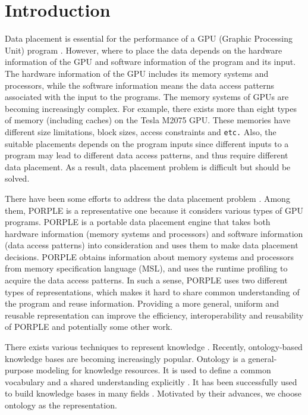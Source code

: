 \documentclass{sig-alternate}
\begin{document}
\section{Introduction}
Data placement is essential for the performance of a GPU (Graphic Processing Unit) program \cite{related1}. However, where to place the data depends on the hardware information of the GPU and software information of the program and its input. The hardware information of the GPU includes its memory systems and processors, while the software information means the data access patterns associated with the input to the programs. The memory systems of GPUs are becoming increasingly complex. For example, there exists more than eight types of memory (including caches) on the Tesla M2075 GPU. These memories have different size limitations, block sizes, access constraints and \texttt{etc.} Also, the suitable placements depends on the program inputs since different inputs to a program may lead to different data access patterns, and thus require different data placement. As a result, data placement problem is difficult but should be solved.

There have been some efforts to address the data placement problem \cite{related1, related2, related3, porple}. Among them, PORPLE \cite{porple} is a representative one because it considers various types of GPU programs. PORPLE is a portable data placement engine that takes both hardware information (memory systems and processors) and software information (data access patterns) into consideration and uses them to make data placement decisions. PORPLE obtains information about memory systems and processors from memory specification language (MSL), and uses the runtime profiling to acquire the data access patterns. In such a sense, PORPLE uses two different types of representations, which makes it hard to share common understanding of the program and reuse information. Providing a more general, uniform and reusable representation can improve the efficiency, interoperability and reusability of PORPLE and potentially some other work.

There exists various techniques to represent knowledge \cite{intro2}. Recently, ontology-based knowledge bases are becoming increasingly popular. Ontology is a general-purpose modeling for knowledge resources. It is used to define a common vocabulary and a shared understanding explicitly \cite{ontology1, ontology2}. It has been successfully used to build knowledge bases in many fields \cite{ontology3, ontology4, ontology5, ontology6, work1, work2}. Motivated by their advances, we choose ontology as the representation.
\end{document}
